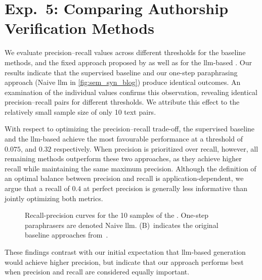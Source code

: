 \section{Exp.\ 5: Comparing Authorship Verification Methods}%
\label{subsec:imp_gen_res}

We evaluate precision–recall values across different thresholds for the baseline methods, and the fixed approach proposed by \citet{koppel_determining_2014} as well as for the \ac{llm}-based \impAppr{}.
Our results indicate that the supervised baseline and our one-step paraphrasing approach (Naive \ac{llm} in \autoref{fig:sem_syn_blog}) produce identical outcomes.
An examination of the individual values confirms this observation, revealing identical precision–recall pairs for different thresholds.
We attribute this effect to the relatively small sample size of only 10 text pairs.

With respect to optimizing the precision–recall trade-off, the supervised baseline and the \ac{llm}-based \impAppr{} achieve the most favourable performance at a threshold of $0.075$, and $0.32$ respectively.
When precision is prioritized over recall, however, all remaining methods outperform these two approaches, as they achieve higher recall while maintaining the same maximum precision.
Although the definition of an optimal balance between precision and recall is application-dependent, we argue that a recall of $0.4$ at perfect precision is generally less informative than jointly optimizing both metrics.

\begin{figure}[htbp]
    \centering
    
    \caption[Recall-precision curves for the \dataStudent{}.]{Recall-precision curves for the 10 samples of the \dataStudent{}. 
    One-step paraphrasers are denoted Naive \ac{llm}.
    (B)~indicates the original baseline approaches from~\citep{koppel_determining_2014}.
    }
    \label{fig:sem_syn_blog}
\end{figure}

These findings contrast with our initial expectation that \ac{llm}-based \imp{} generation would achieve higher precision, but indicate that our approach performs best when precision and recall are considered equally important.
